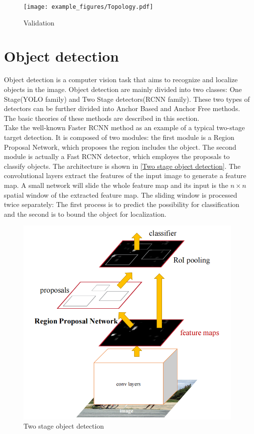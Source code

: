  \begin{figure}[!htbp]
  \centering
  \texttt{[image: example\_figures/Topology.pdf]}
  \caption{Validation}
  \label{fig:Topology of the eleven-segment wire harness}
\end{figure}
\section{Object detection}
  Object detection is a computer vision task that aims to recognize and localize objects in the image. Object detection are mainly divided into two classes: 
  One Stage(YOLO family) and Two Stage detectors(RCNN family). These two types of detectors can be further divided into Anchor Based and Anchor Free methods. 
  The basic theories of these methods are described in this section.\\
  Take the well-known Faster RCNN method as an example of a typical two-stage target detection\cite{NIPS2015_14bfa6bb}. It is composed of two modules: the 
  first module is a Region Proposal Network, which proposes the region includes the object. The second module is actually a Fast RCNN detector, which employes
  the proposals to classify objects. The architecture is shown in \autoref{Two stage object detection}. The convolutional layers extract the features of the 
  input image to generate a feature map. A small network will slide the whole feature map and its input is the $n \times n$ spatial window of the extracted feature map.
  The sliding window is processed twice separately: The first process is to predict the possibility for classification and the second is to bound the object for localization.\\
  \begin{figure}[!htbp]
    \centering
    \includegraphics[width=0.6\linewidth]{example_images/two_stage_detection}
    \caption{Two stage object detection\cite{NIPS2015_14bfa6bb}}
    \label{Two stage object detection}
  \end{figure}
